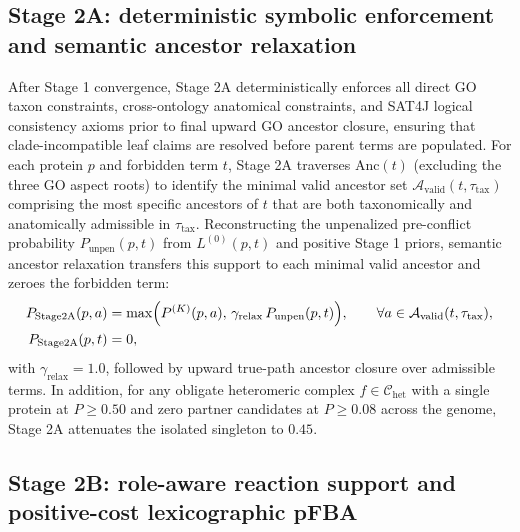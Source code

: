 \documentclass[10pt,twocolumn]{article}
\begin{document}
\subsection{Stage 2A: deterministic symbolic enforcement and semantic ancestor relaxation}

After Stage 1 convergence, Stage 2A deterministically enforces all direct GO taxon constraints, cross-ontology anatomical constraints, and SAT4J logical consistency axioms prior to final upward GO ancestor closure, ensuring that clade-incompatible leaf claims are resolved before parent terms are populated. For each protein $p$ and forbidden term $t$, Stage 2A traverses $\text{Anc}(t)$ (excluding the three GO aspect roots) to identify the minimal valid ancestor set $\mathcal{A}_{\text{valid}}(t, \tau_{\text{tax}})$ comprising the most specific ancestors of $t$ that are both taxonomically and anatomically admissible in $\tau_{\text{tax}}$. Reconstructing the unpenalized pre-conflict probability $P_{\text{unpen}}(p, t)$ from $L^{(0)}(p, t)$ and positive Stage 1 priors, semantic ancestor relaxation transfers this support to each minimal valid ancestor and zeroes the forbidden term:
\begin{align}
  P_{\text{Stage2A}}(p, a) &= \max\Bigl(P^{(K)}(p, a), \, \gamma_{\text{relax}} \, P_{\text{unpen}}(p, t)\Bigr), \qquad \forall a \in \mathcal{A}_{\text{valid}}(t, \tau_{\text{tax}}), \nonumber \\
  P_{\text{Stage2A}}(p, t) &= 0,
  \label{eq:relax}
\end{align}
with $\gamma_{\text{relax}} = 1.0$, followed by upward true-path ancestor closure over admissible terms. In addition, for any obligate heteromeric complex $f \in \mathcal{C}_{\text{het}}$ with a single protein at $P \ge 0.50$ and zero partner candidates at $P \ge 0.08$ across the genome, Stage 2A attenuates the isolated singleton to $0.45$.

\subsection{Stage 2B: role-aware reaction support and positive-cost lexicographic pFBA}
\label{sec:methods_fba}
\end{document}
